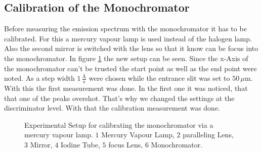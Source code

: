 \subsection{Calibration of the Monochromator}
Before measuring the emission spectrum with the monochromator it has to be calibrated. For this a mercury vapour lamp is used instead of the halogen lamp. Also the second mirror is switched with the lens so that it know can be focus into the monochromator. In figure \ref{figCalib} the new setup can be seen. Since the x-Axis of the monochromator can't be trusted the start point as well as the end point were noted. As a step width $1\,\frac{\text{\AA}}{\text{s}}$ were chosen while the entrance slit was set to $50\,\mu$m. With this the first measurement was done. In the first one it was noticed, that that one of the peaks overshot. That's why we changed the settings at the discriminator level. With that the calibration measurement was done.
\begin{figure}[ht]
	\centering
	\caption[Experimental Setup 2]{Experimental Setup for calibrating the monochromator via a mercury vapour lamp. $1$ Mercury Vapour Lamp, $2$ paralleling Lens, $3$ Mirror, $4$ Iodine Tube, $5$ focus Lens, $6$ Monochromator.}
	\label{figCalib}
\end{figure}
\newpage
